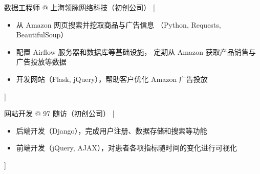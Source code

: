 \documentclass[zh]{resume}
\begin{document}
\begin{experiences}
    {数据工程师 @ 上海领脉网络科技（初创公司）}%
    [\begin{itemize}
      \item 从 Amazon 网页搜索并挖取商品与广告信息
        （Python, Requests, BeautifulSoup）
      \item 配置 Airflow 服务器和数据库等基础设施，
        定期从 Amazon 获取产品销售与广告投放等数据
      \item 开发网站（Flask, jQuery），帮助客户优化 Amazon 广告投放
    \end{itemize}]

  \separator{0.5ex}
    {网站开发 @ 97 随访（初创公司）}%
    [\begin{itemize}
      \item 后端开发（Django），完成用户注册、数据存储和搜索等功能
      \item 前端开发（jQuery, AJAX），对患者各项指标随时间的变化进行可视化
    \end{itemize}]
\end{experiences}
\end{document}
